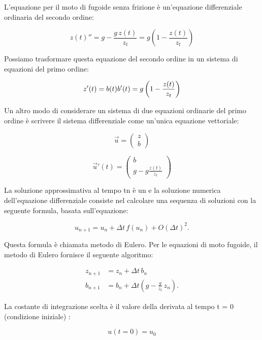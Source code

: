 
L’equazione per il moto di fugoide senza frizione è un’equazione differenziale ordinaria del secondo ordine: 

\begin{equation}
z(t)'' = g - \frac{g \,z(t)}{z_t} = g \left(1 - \frac{z(t)}{z_t}\right)
\end{equation}

Possiamo trasformare questa equazione del secondo ordine in un sistema di equazioni del primo ordine: 

\begin{equation}
z'(t) = b(t)\\
b'(t) = g\left(1-\frac{z(t)}{z_t}\right)
\end{equation}

Un altro modo di considerare un sistema di due equazioni ordinarie del primo ordine è scrivere il sistema differenziale come un’unica equazione vettoriale: 

\begin{equation}
\vec{u}  = \begin{pmatrix} z \\ b \end{pmatrix}
\end{equation}

\begin{equation}
\vec{u}'(t)  = \begin{pmatrix} b\\ g-g\frac{z(t)}{z_t} \end{pmatrix}
\end{equation}

La soluzione approssimativa al tempo tn è un e la soluzione numerica dell’equazione differenziale consiste nel calcolare una sequenza di soluzioni con la seguente formula, basata sull’equazione: 

\begin{equation}
u_{n+1} = u_n + \Delta t \,f(u_n) + O(\Delta t)^2.
\end{equation}

Questa formula è chiamata metodo di Eulero. Per le equazioni di moto fugoide, il metodo di Eulero fornisce il seguente algoritmo:

\begin{align}
z_{n+1} & = z_n + \Delta t \, b_n \\
b_{n+1} & = b_n + \Delta t \left(g - \frac{g}{z_t} \, z_n \right).
\end{align}

La costante di integrazione scelta è il valore della derivata al tempo t = 0 (condizione iniziale) : 

\begin{equation}
u(t=0)=u_0
\end{equation}